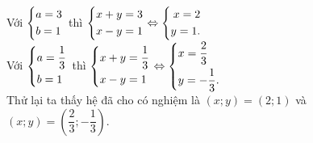 \begin{ex}
{\begin{enumerate}
        Với $\left\{\begin{aligned}&a=3\\&b=1\end{aligned}\right.$ thì $\left\{\begin{aligned}& x+y=3 \\ & x-y=1 \end{aligned}\right. \Leftrightarrow \left\{\begin{aligned}x=2 \\ y= 1.\end{aligned}\right.$\\
        Với $\left\{\begin{aligned}&a=\dfrac{1}{3}\\&b=1\end{aligned}\right.$ thì $\left\{\begin{aligned}& x+y=\dfrac{1}{3} \\ & x-y=1 \end{aligned}\right. \Leftrightarrow \left\{\begin{aligned}& x=\dfrac{2}{3} \\ & y= - \dfrac{1}{3}.\end{aligned}\right.$\\
        Thử lại ta thấy hệ đã cho có nghiệm là 
         $(x;y) = (2;1)$ và $(x;y)= \left(\dfrac{2}{3};-\dfrac{1}{3}\right).$         
        
    \end{enumerate}
    }
\end{ex}


